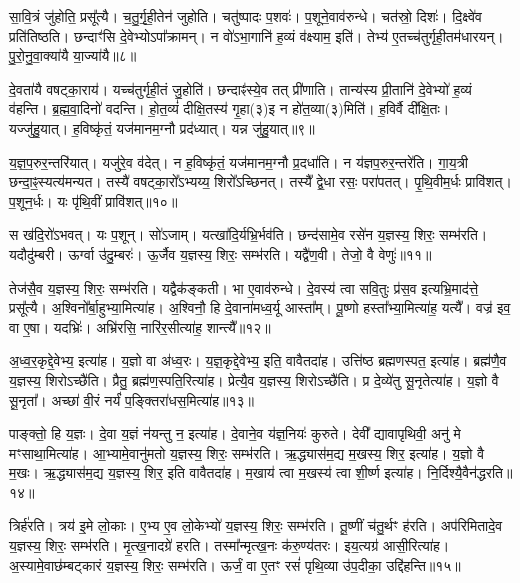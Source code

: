 सा॒वि॒त्रं जु॑होति॒ प्रसू᳚त्यै। 
च॒तु॒र्गृ॒ही॒तेन॑ जुहोति। 
चतु॑ष्पादः प॒शवः॑। 
प॒शूने॒वाव॑रुन्धे। 
चत॑स्रो॒ दिशः॑। 
दि॒क्ष्वे॑व प्रति॑तिष्ठति। 
छन्दाꣳ॑सि दे॒वेभ्योऽपा᳚क्रामन्। 
न वो॑ऽभा॒गानि॑ ह॒व्यं व॑क्ष्याम॒ इति॑। 
तेभ्य॑ ए॒तच्च॑तुर्गृही॒तम॑धारयन्। 
पु॒रो॒नु॒वा॒क्या॑यै या॒ज्या॑यै॥८॥

दे॒वता॑यै वषट्का॒राय॑। 
यच्च॑तुर्गृही॒तं जु॒होति॑। 
छन्दाꣴ॑स्ये॒व तत् प्री॑णाति। 
तान्य॑स्य प्री॒तानि॑ दे॒वेभ्यो॑ ह॒व्यं व॑हन्ति। 
ब्र॒ह्म॒वा॒दिनो॑ वदन्ति। 
हो॒त॒व्यं॑ दीक्षि॒तस्य॑ गृ॒हा(३)इ न हो॑त॒व्या(३)मिति॑। 
ह॒विर्\mbox{}वै दी᳚क्षि॒तः। 
यज्जु॑हु॒यात्। 
ह॒विष्कृ॑तं॒ यज॑मानम॒ग्नौ प्रद॑ध्यात्। 
यन्न जु॑हु॒यात्॥९॥

य॒ज्ञ॒प॒रुर॒न्तरि॑यात्। 
यजु॑रे॒व व॑देत्। 
न ह॒विष्कृ॑तं॒ यज॑मानम॒ग्नौ प्र॒दधा॑ति। 
न य॑ज्ञप॒रुर॒न्तरे॑ति। 
गा॒य॒त्री छन्दा॒ꣴ॒स्यत्य॑मन्यत। 
तस्यै॑ वषट्का॒रो᳚ऽभ्यय्य॒ शिरो᳚ऽच्छिनत्। 
तस्यै᳚ द्वे॒धा रसः॒ परा॑पतत्। 
पृ॒थि॒वीम॒र्धः प्रावि॑शत्। 
प॒शून॒र्धः। 
यः पृ॑थि॒वीं प्रावि॑शत्॥१०॥

स ख॑दि॒रो॑ऽभवत्। 
यः प॒शून्। 
सो॑ऽजाम्। 
यत्खा॑दि॒र्यभ्रि॒र्भ\-व॑ति। 
छन्द॑सामे॒व रसे॑न य॒ज्ञस्य॒ शिरः॒ सम्भ॑रति। 
यदौदु॑म्बरी। 
ऊर्ग्वा उ॑दु॒म्बरः॑। 
ऊ॒र्जैव य॒ज्ञस्य॒ शिरः॒ सम्भ॑रति। 
यद्वै॑ण॒वी। 
तेजो॒ वै वेणुः॑॥११॥

तेज॑सै॒व य॒ज्ञस्य॒ शिरः॒ सम्भ॑रति। 
यद्वैक॑ङ्कती। 
भा ए॒वाव॑रुन्धे। 
दे॒वस्य॑ त्वा सवि॒तुः प्र॑स॒व इत्यभ्रि॒माद॑त्ते॒ प्रसू᳚त्यै। 
अ॒श्विनो᳚र्बा॒हुभ्या॒\-मित्या॑ह। 
अ॒श्विनौ॒ हि दे॒वाना॑मध्व॒र्यू आस्ता᳚म्। 
पू॒ष्णो हस्ता᳚भ्या॒मित्या॑ह॒ यत्यै᳚। 
वज्र॑ इव॒ वा ए॒षा। 
यदभ्रिः॑। 
अभ्रि॑रसि॒ नारि॑र॒सीत्या॑ह॒ शान्त्यै᳚॥१२॥

अ॒ध्व॒र॒कृद्दे॒वेभ्य॒ इत्या॑ह। 
य॒ज्ञो वा अ॑ध्व॒रः। 
य॒ज्ञ॒कृद्दे॒वेभ्य॒ इति॒ वावैतदा॑ह। 
उत्ति॑ष्ठ ब्रह्मणस्पत॒ इत्या॑ह। 
ब्रह्म॑णै॒व य॒ज्ञस्य॒ शिरोऽच्छै॑ति। 
प्रैतु॒ ब्रह्म॑ण॒स्पति॒रित्या॑ह। 
प्रेत्यै॒व य॒ज्ञस्य॒ शिरोऽच्छै॑ति। 
प्र दे॒व्ये॑तु सू॒नृतेत्या॑ह। 
य॒ज्ञो वै सू॒नृता᳚। 
अच्छा॑ वी॒रं नर्यं॑ प॒ङ्क्तिरा॑धस॒मित्या॑ह॥१३॥

पाङ्क्तो॒ हि य॒ज्ञः। 
दे॒वा य॒ज्ञं न॑यन्तु न॒ इत्या॑ह। 
दे॒वाने॒व य॑ज्ञ॒नियः॑ कुरुते। 
देवी᳚ द्यावापृथिवी॒ अनु॑ मे मꣳसाथा॒मित्या॑ह। 
आ॒भ्यामे॒वानु॑मतो य॒ज्ञस्य॒ शिरः॒ सम्भ॑रति। 
ऋ॒द्ध्यास॑म॒द्य म॒खस्य॒ शिर॒ इत्या॑ह। 
य॒ज्ञो वै म॒खः। 
ऋ॒द्ध्यास॑म॒द्य य॒ज्ञस्य॒ शिर॒ इति वावैतदा॑ह। 
म॒खाय॑ त्वा म॒खस्य॑ त्वा शी॒र्ष्ण इत्या॑ह। 
नि॒र्दिश्यै॒वैन॑द्धरति॥१४॥

त्रिर्\mbox{}ह॑रति। 
त्रय॑ इ॒मे लो॒काः। 
ए॒भ्य ए॒व लो॒केभ्यो॑ य॒ज्ञस्य॒ शिरः॒ सम्भ॑रति। 
तू॒ष्णीं च॑तु॒र्थꣳ ह॑रति। 
अप॑रिमितादे॒व य॒ज्ञस्य॒ शिरः॒ सम्भ॑रति। 
मृ॒त्ख॒नादग्रे॑ हरति। 
तस्मा᳚न्मृत्ख॒नः क॑रु॒ण्य॑तरः। 
इय॒त्यग्र॑ आसी॒रित्या॑ह। 
अ॒स्यामे॒वाछ॑म्बट्कारं य॒ज्ञस्य॒ शिरः॒ सम्भ॑रति। 
ऊर्जं॒ वा ए॒तꣳ रसं॑ पृथि॒व्या उ॑प॒दीका॒ उद्दि॑हन्ति॥१५॥

